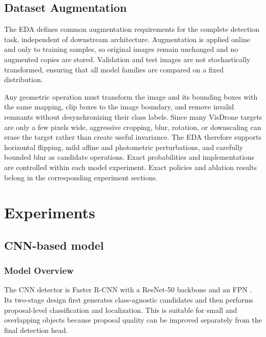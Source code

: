 \subsection{Dataset Augmentation}
\label{subsec:augmentation}

The EDA defines common augmentation requirements for the complete detection
task, independent of downstream architecture. Augmentation is applied online
and only to training samples, so original images remain unchanged and no
augmented copies are stored. Validation and test images are not stochastically
transformed, ensuring that all model families are compared on a fixed
distribution.

Any geometric operation must transform the image and its bounding boxes with
the same mapping, clip boxes to the image boundary, and remove invalid remnants
without desynchronizing their class labels. Since many VisDrone targets are
only a few pixels wide, aggressive cropping, blur, rotation, or downscaling can
erase the target rather than create useful invariance. The EDA therefore
supports horizontal flipping, mild affine and photometric perturbations, and
carefully bounded blur as candidate operations. Exact probabilities and
implementations are controlled within each model experiment. Exact policies
and ablation results belong in the corresponding experiment sections.

\section{Experiments}
\label{sec:experiments}

\subsection{CNN-based model}
\label{subsec:cnn-model}

\subsubsection{Model Overview}
\label{subsubsec:cnn-overview}

The CNN detector is Faster R-CNN \cite{ren2015faster} with a ResNet-50 backbone
\cite{he2016resnet} and an FPN \cite{lin2017fpn}. Its two-stage design first
generates class-agnostic candidates and then performs proposal-level
classification and localization. This is suitable for small and overlapping
objects because proposal quality can be improved separately from the final
detection head.

